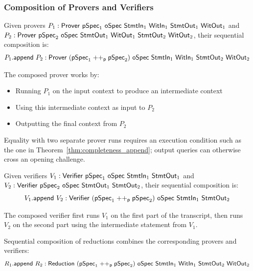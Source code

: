 \subsubsection{Composition of Provers and Verifiers}

\begin{definition}
    \label{def:prover_append}
    Given provers $P_1 : \Prover\ \pSpec_1\ \oSpec\ \StmtIn_1\ \WitIn_1\ \StmtOut_1\ \WitOut_1$ and $P_2 : \Prover\ \pSpec_2\ \oSpec\ \StmtOut_1\ \WitOut_1\ \StmtOut_2\ \WitOut_2$, their sequential composition is:
    \[ P_1.\append\ P_2 : \Prover\ (\pSpec_1 \mathrel{++_\mathsf{p}} \pSpec_2)\ \oSpec\ \StmtIn_1\ \WitIn_1\ \StmtOut_2\ \WitOut_2 \]

    The composed prover works by:
    \begin{itemize}
        \item Running $P_1$ on the input context to produce an intermediate context
        \item Using this intermediate context as input to $P_2$
        \item Outputting the final context from $P_2$
    \end{itemize}
    Equality with two separate prover runs requires an execution condition such as the one in
    Theorem~\ref{thm:completeness_append}; output queries can otherwise cross an opening challenge.
    \leanok
\end{definition}

\begin{definition}
    \label{def:verifier_append}
    Given verifiers $V_1 : \Verifier\ \pSpec_1\ \oSpec\ \StmtIn_1\ \StmtOut_1$ and $V_2 : \mathsf{Verifier}\ \mathsf{pSpec}_2\ \mathsf{oSpec}\ \mathsf{StmtOut}_1\ \mathsf{StmtOut}_2$, their sequential composition is:
    \[ V_1.\append\ V_2 : \Verifier\ (\pSpec_1 \mathrel{++_\mathsf{p}} \pSpec_2)\ \oSpec\ \StmtIn_1\ \StmtOut_2 \]

    The composed verifier first runs $V_1$ on the first part of the transcript, then runs $V_2$ on the second part using the intermediate statement from $V_1$.
    \leanok
\end{definition}

\begin{definition}
    \label{def:reduction_append}
    Sequential composition of reductions combines the corresponding provers and verifiers:
    \[ R_1.\append\ R_2 : \Reduction\ (\pSpec_1 \mathrel{++_\mathsf{p}} \pSpec_2)\ \oSpec\ \StmtIn_1\ \WitIn_1\ \StmtOut_2\ \WitOut_2 \]
    \leanok
\end{definition}

